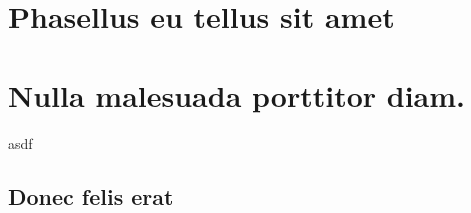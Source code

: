 \documentclass[a4paper,11pt,bcor=10mm,marginright]{tubsartcl}
\begin{document}
\section{Phasellus eu tellus sit amet}

\lipsum[2-5]

\section{Nulla malesuada porttitor diam.}

\lipsum[1-3]

\begin{gausspage}
  \begin{segment}[bgcolor=tuOrange]{2}
    \begin{gaussbox}[bgcolor=tuBlue]{1}{1}{3}{2}
      asdf
    \end{gaussbox}
  \end{segment}
\clearpage
\end{gausspage}


\subsection{Donec felis erat}

\lipsum[4-7]
\end{document}
